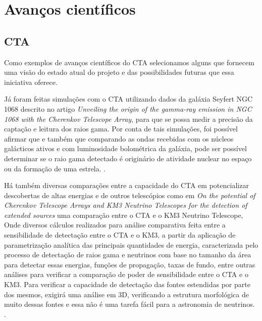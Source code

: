 \documentclass[10pt, conference, compsocconf]{IEEEtran}
\begin{document}
\section{Avanços científicos}

\subsection{CTA}

Como exemplos de avanços científicos do CTA selecionamos alguns que fornecem uma visão do estado atual do projeto e das possibilidades futuras que essa iniciativa oferece. 

Já foram feitas simulações com o CTA utilizando dados da galáxia Seyfert  NGC 1068 descrito no artigo {\textit{Unveiling the origin of the gamma-ray emission in NGC 1068 with the Cherenkov Telescope Array}}, para que se possa medir a precisão da captação e leitura dos raios gama. Por conta de tais simulações, foi possível afirmar que  e também que comparando as ondas recebidas com os núcleos galácticos ativos e com luminosidade bolométrica da galáxia, pode ser possível determinar se o raio gama detectado é originário de atividade nuclear no espaço ou da formação de uma estrela. \cite{LAMASTRA201916}. 

Há também diversas comparações entre a capacidade do CTA em potencializar  descobertas de altas energias e de  outros telescópios  como em \textit{On the potential of Cherenkov Telescope Arrays and KM3 Neutrino Telescopes for the detection of extended sources} uma comparação entre o CTA e o KM3 Neutrino Telescope, Onde diversos cálculos realizados para análise comparativa feita entre a sensibilidade de detectação entre o CTA e o KM3, a partir da aplicação de parametrização analítica das principais quantidades de energia, caracterizada pelo processo de detectação de raios gama e neutrinos com base no tamanho da área para detectar essas energias, funções de propagação, taxas de fundo, entre outras análises para verificar a comparação de poder de sensibilidade entre o CTA e o KM3. Para verificar a capacidade de detectação das fontes estendidas por parte dos mesmos, exigirá uma análise em 3D, verificando a estrutura morfológica de muito dessas fontes e essa não é uma tarefa fácil para a astronomia de neutrinos. \cite{Ambrogi:2018skq}.
\end{document}
